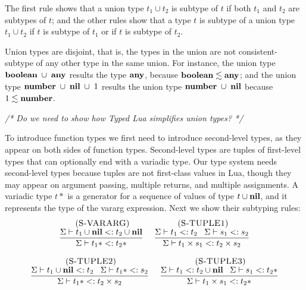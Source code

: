 The first rule shows that a union type $t_{1} \cup t_{2}$
is subtype of $t$ if both $t_{1}$ and $t_{2}$ are subtypes
of $t$;
and the other rules show that a type $t$ is subtype
of a union type $t_{1} \cup t_{2}$ if $t$ is subtype of
$t_{1}$ or if $t$ is subtype of $t_{2}$.

Union types are disjoint, that is, the types in the union are not
consistent-subtype of any other type in the same union.
For instance, the union type $\mathbf{boolean} \;\cup\; \mathbf{any}$ results the
type $\mathbf{any}$, because $\mathbf{boolean} \lesssim \mathbf{any}$;
and the union type $\mathbf{number} \;\cup\; \mathbf{nil} \;\cup\; 1$ results the union
type $\mathbf{number} \;\cup\; \mathbf{nil}$ because $1 \lesssim \mathbf{number}$.

\emph{/* Do we need to show how Typed Lua simplifies union types? */}

To introduce function types we first need to introduce
second-level types, as they appear on both sides of function types.
Second-level types are tuples of first-level types
that can optionally end with a variadic type.
Our type system needs second-level types because tuples are
not first-class values in Lua, though they may appear on
argument passing, multiple returns, and multiple assignments.
A variadic type $t*$ is a generator for a sequence of values of
type $t \cup \mathbf{nil}$, and it represents the type of the vararg
expression.
Next we show their subtyping rules:
\[
\begin{array}{c}
\begin{array}{c}
\; (\textsc{S-VARARG})\\
\dfrac{\Sigma \vdash t_{1} \cup \mathbf{nil} <: t_{2} \cup \mathbf{nil}}
      {\Sigma \vdash t_{1}* <: t_{2}*}
\end{array}
\;
\begin{array}{c}
\; (\textsc{S-TUPLE1})\\
\dfrac{\Sigma \vdash t_{1} <: t_{2} \;\;\;
       \Sigma \vdash s_{1} <: s_{2}}
      {\Sigma \vdash t_{1} \times s_{1} <: t_{2} \times s_{2}}
\end{array}
\\ \\
\begin{array}{c}
\; (\textsc{S-TUPLE2})\\
\dfrac{\Sigma \vdash t_{1} \cup \mathbf{nil} <: t_{2} \;\;\;
       \Sigma \vdash t_{1}* <: s_{2}}
      {\Sigma \vdash t_{1}* <: t_{2} \times s_{2}}
\end{array}
\;
\begin{array}{c}
\; (\textsc{S-TUPLE3})\\
\dfrac{\Sigma \vdash t_{1} <: t_{2} \cup \mathbf{nil} \;\;\;
       \Sigma \vdash s_{1} <: t_{2}*}
      {\Sigma \vdash t_{1} \times s_{1} <: t_{2}*}
\end{array}
\end{array}
\]

